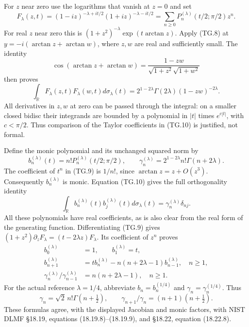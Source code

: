 \documentclass[11pt,a4paper]{article}
\begin{document}
For \(z\) near zero use the logarithms that vanish at \(z=0\) and set
\[
 F_\lambda(z,t)=(1-iz)^{-\lambda+it/2}
                        (1+iz)^{-\lambda-it/2}
      =\sum_{n\geq0}P_n^{(\lambda)}(t/2;\pi/2)z^n.
                                                               \tag{TG.9}
\]
For real \(z\) near zero this is
\((1+z^2)^{-\lambda}\exp(t\arctan z)\).  Apply (TG.8) at
\(y=-i(\arctan z+\arctan w)\), where \(z,w\) are real and
sufficiently small.  The identity
\[
 \cos(\arctan z+\arctan w)
        =\frac{1-zw}{\sqrt{1+z^2}\sqrt{1+w^2}}
\]
then proves
\[
 \int_{\mathbb R}F_\lambda(z,t)F_\lambda(w,t)
                            d\sigma_\lambda(t)
   =2^{1-2\lambda}\Gamma(2\lambda)(1-zw)^{-2\lambda}.
                                                               \tag{TG.10}
\]
All derivatives in \(z,w\) at zero can be passed through the
integral: on a smaller closed bidisc their integrands are bounded
by a polynomial in \(|t|\) times \(e^{c|t|}\), with
\(c<\pi/2\).  Thus comparison of the Taylor coefficients in
(TG.10) is justified, not formal.

Define the monic polynomial and its unchanged squared norm by
\[
 b_n^{(\lambda)}(t)=n!P_n^{(\lambda)}(t/2;\pi/2),\qquad
 \gamma_n^{(\lambda)}=2^{1-2\lambda}n!\Gamma(n+2\lambda).
                                                               \tag{TG.11}
\]
The coefficient of \(t^n\) in (TG.9) is \(1/n!\), since
\(\arctan z=z+O(z^3)\).  Consequently \(b_n^{(\lambda)}\)
is monic.  Equation (TG.10) gives the full orthogonality identity
\[
 \int_{\mathbb R}b_n^{(\lambda)}(t)b_j^{(\lambda)}(t)
                   d\sigma_\lambda(t)
       =\gamma_n^{(\lambda)}\delta_{nj}.
                                                               \tag{TG.12}
\]
All these polynomials have real coefficients, as is also clear from
the real form of the generating function.  Differentiating (TG.9)
gives \((1+z^2)\partial_zF_\lambda=(t-2\lambda z)F_\lambda\).
Its coefficient of \(z^n\) proves
\[
 \begin{aligned}
 b_0^{(\lambda)}&=1,\qquad b_1^{(\lambda)}=t,\\
 b_{n+1}^{(\lambda)}&=t b_n^{(\lambda)}
              -n(n+2\lambda-1)b_{n-1}^{(\lambda)},\quad n\geq1,\\
 \gamma_n^{(\lambda)}/\gamma_{n-1}^{(\lambda)}
              &=n(n+2\lambda-1),\quad n\geq1.
 \end{aligned}                                                    \tag{TG.13}
\]
For the actual reference \(\lambda=1/4\), abbreviate
\(b_n=b_n^{(1/4)}\) and \(\gamma_n=\gamma_n^{(1/4)}\).  Thus
\[
 \boxed{\gamma_n=\sqrt2\,n!\Gamma(n+\tfrac12),\qquad
           \gamma_{n+1}/\gamma_n=(n+1)(n+\tfrac12).}
                                                               \tag{TG.14}
\]
These formulas agree, with the displayed Jacobian and monic factors,
with NIST DLMF \S18.19, equations (18.19.8)--(18.19.9), and \S18.22,
equation (18.22.8).
\end{document}
